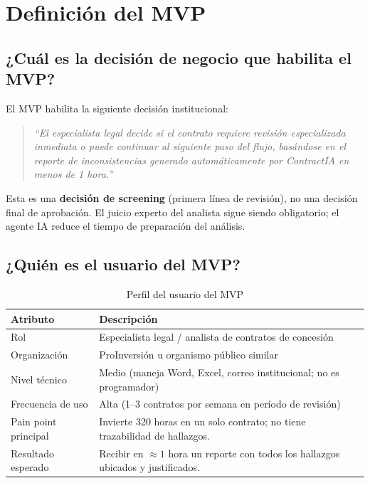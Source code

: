 \section{Definición del MVP}

\subsection{¿Cuál es la decisión de negocio que habilita el MVP?}

El MVP habilita la siguiente decisión institucional:

\begin{quote}
\textit{``El especialista legal decide si el contrato requiere revisión
especializada inmediata o puede continuar al siguiente paso del flujo,
basándose en el reporte de inconsistencias generado automáticamente
por ContractIA en menos de 1 hora.''}
\end{quote}

Esta es una \textbf{decisión de screening} (primera línea de revisión),
no una decisión final de aprobación. El juicio experto del analista
sigue siendo obligatorio; el agente IA reduce el tiempo de preparación
del análisis.

\subsection{¿Quién es el usuario del MVP?}

\begin{table}[H]
\centering
\caption{Perfil del usuario del MVP}
\label{tab:usuario_mvp}
\begin{tabular}{p{4cm} p{10cm}}
\toprule
\textbf{Atributo} & \textbf{Descripción} \\
\midrule
Rol & Especialista legal / analista de contratos de concesión \\[4pt]
Organización & ProInversión u organismo público similar \\[4pt]
Nivel técnico & Medio (maneja Word, Excel, correo institucional; no es programador) \\[4pt]
Frecuencia de uso & Alta (1–3 contratos por semana en período de revisión) \\[4pt]
Pain point principal &
  Invierte 320 horas en un solo contrato; no tiene trazabilidad de hallazgos. \\[4pt]
Resultado esperado &
  Recibir en $\approx 1$ hora un reporte con todos los hallazgos ubicados y justificados. \\
\bottomrule
\end{tabular}
\end{table}

